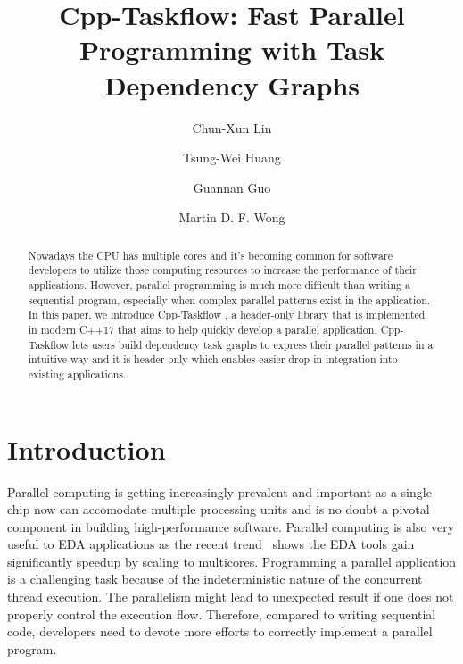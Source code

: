\documentclass[sigconf]{acmart}
\begin{document}

\fancyhead{}
\title{Cpp-Taskflow: Fast Parallel Programming with Task Dependency Graphs}



\author{Chun-Xun Lin}
%
\author{Tsung-Wei Huang}
%
\author{Guannan Guo}
%
\author{Martin D. F. Wong}





\begin{abstract}
Nowadays the CPU has multiple cores and it's becoming common for software 
developers to utilize those computing resources to increase the performance of their applications.
However, parallel programming is much more difficult than writing a sequential program, 
especially when complex parallel patterns exist in the application. 
In this paper, we introduce Cpp-Taskflow \cite{cpp-taskflow}, a header-only library that is implemented in
modern C++17 that aims to help quickly develop a parallel application. Cpp-Taskflow lets 
users build dependency task graphs to express their parallel patterns in a intuitive way 
and it is header-only which enables easier drop-in integration into existing applications.



\end{abstract}


\maketitle


\section{Introduction}
\label{sec::introduction}
Parallel computing is getting increasingly prevalent and important as a single
chip now can accomodate multiple processing units and is no doubt a pivotal
component in building high-performance software. 
Parallel computing is also very useful to EDA applications as the recent
trend~\cite{stok}\cite{Lu2018} shows the EDA tools gain significantly speedup
by scaling to multicores.  Programming a parallel application is a challenging
task because of the indeterministic nature of the concurrent thread execution.
The parallelism might lead to unexpected result if one does not properly
control the execution flow.  
Therefore, compared to writing sequential code, developers need to devote 
more efforts to correctly implement a parallel program.
\end{document}
